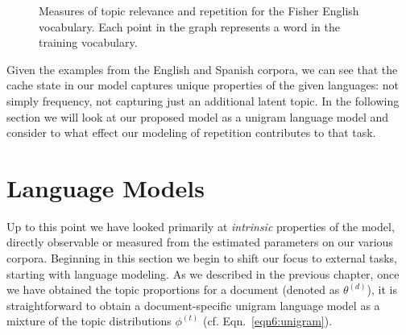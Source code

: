 \begin{figure}
\begin{center}
\hfill
{}
\end{center}
\caption[Topic relevance and repetition of English Words]{Measures of topic relevance and repetition for the Fisher English vocabulary. Each point in the graph represents a word in the training vocabulary. \label{fig6:repEnglish2}}
\end{figure}

Given the examples from the English and Spanish corpora, we can see that the cache state in our model captures unique properties of the given languages:  not simply frequency, not capturing just an additional latent topic.  In the following section we will look at our proposed model as a unigram language model and consider to what effect our modeling of repetition contributes to that task.

\section{Language Models}
Up to this point we have looked primarily at \textit{intrinsic} properties of the model, directly observable or measured from the estimated parameters on our various corpora.  Beginning in this section we begin to shift our focus to external tasks, starting with language modeling.  As we described in the previous chapter, once we have obtained the topic proportions for a document (denoted as $\theta^{(d)}$), it is straightforward to obtain a document-specific unigram language model as a mixture of the topic distributions $\phi^{(t)}$ (cf. Eqn.~\ref{eqn6:unigram}).  

